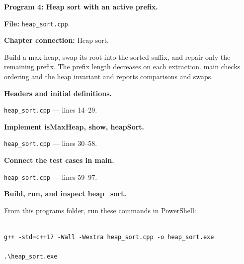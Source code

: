 \textbf{Program 4: Heap sort with an active prefix.}

\textbf{File:} \texttt{heap\_sort.cpp}.

\textbf{Chapter connection:} Heap sort.

Build a max-heap, swap its root into the sorted suffix, and repair only the remaining prefix. The prefix length decreases on each extraction. main checks ordering and the heap invariant and reports comparisons and swaps.



\begin{utpsteps}\setcounter{enumi}{0}\item \textbf{Headers and initial definitions.}\end{utpsteps}

\texttt{heap\_sort.cpp} --- lines 14--29.




\tcbbreak

\begin{utpsteps}\setcounter{enumi}{1}\item \textbf{Implement isMaxHeap, show, heapSort.}\end{utpsteps}

\texttt{heap\_sort.cpp} --- lines 30--58.






\tcbbreak

\begin{utpsteps}\setcounter{enumi}{2}\item \textbf{Connect the test cases in main.}\end{utpsteps}

\texttt{heap\_sort.cpp} --- lines 59--97.




\tcbbreak

\textbf{Build, run, and inspect heap\_sort.}

From this program\textquotesingle s folder, run these commands in PowerShell:

\begin{lstlisting}[style=utpterminal,language={}]

g++ -std=c++17 -Wall -Wextra heap_sort.cpp -o heap_sort.exe

.\heap_sort.exe

\end{lstlisting}

